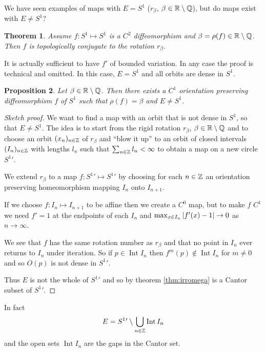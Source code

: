 \documentclass{notes}
\newcommand{\Q}{\mathbb{Q}}
\DeclareMathOperator{\inter}{Int}
\theoremstyle{plain}
\newtheorem{proposition}{Proposition}[chapter]
\newtheorem{theorem}[proposition]{Theorem}
\begin{document}
We have seen examples of maps with $E=S^1$ ($r_\beta$, $\beta \in \R \setminus
\Q$), but do maps exist with $E \neq S^1$?

\begin{theorem}
Assume $f \colon S^1 \mapsto S^1$ is a $C^2$ diffeomorphism and
$\beta = \rho(f) \in \R \setminus \Q$.  Then $f$ is topologically conjugate
to the rotation $r_\beta$.
\end{theorem}

It is actually sufficient to have $f'$ of bounded variation.  In
any case the proof is technical and omitted.  In this case, $E=S^1$
and all orbits are dense in $S^1$.

\begin{proposition}
Let $\beta \in \R \setminus \Q$.  Then there exists a
$C^1$ orientation preserving diffeomorphism $f$ of $S^1$ such that
$\rho(f) = \beta$ and $E \neq S^1$.
\end{proposition}

\begin{proof}[Sketch proof]
We want to find a map with an orbit that is not dense in $S^1$,
so that $E \neq S^1$.  The idea is to start from the rigid rotation
$r_\beta$, $\beta \in \R \setminus \Q$ and to choose an orbit $(x_n)_{n \in
\mathbb{Z}}$ of $r_\beta$ and ``blow it up'' to an orbit of closed intervals
$(I_n)_{n \in \mathbb{Z}}$ with lengths $l_n$ such that $\sum_{n \in \mathbb{Z}} l_n
< \infty$ to obtain a map on a new circle $S^1{}'$.

\vspace{1in}

We extend $r_\beta$ to a map $f \colon S^1{}' \mapsto S^1{}'$ by
choosing for each $n \in \mathbb{Z}$ an orientation preserving homeomorphism
mapping $I_n$ onto $I_{n+1}$.

If we choose $f \colon I_n \mapsto I_{n+1}$ to be affine then we create
a $C^0$ map, but to make $f$ $C^1$ we need $f' = 1$ at the endpoints of
each $I_n$ and $\max_{x \in I_n} \left|f'(x) - 1\right| \to 0$ as $n \to \infty$.

We see that $f$ has the same rotation number as $r_\beta$ and that no
point in $I_n$ ever returns to $I_n$ under iteration.  So if
$p \in \inter I_n$ then $f^m(p) \notin \inter I_n$ for $m \neq 0$ and
so $O(p)$ is not dense in $S^1{}'$.

Thus $E$ is not the whole of $S^1{}'$ and so by theorem \ref{thm:irromega}
is a Cantor subset of $S^1{}'$.
\end{proof}

In fact
\[
E = S^1{}' \setminus \bigcup_{n \in \Z} \inter I_n
\]
and the open sets $\inter I_n$ are the gaps in the Cantor set.
\end{document}

